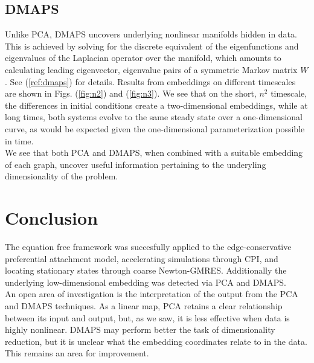 \documentclass[12pt]{article}
\begin{document}
\begin{onehalfspace}
\subsection{DMAPS}

Unlike PCA, DMAPS uncovers underlying nonlinear manifolds hidden in data. This is achieved by solving for the discrete equivalent of the eigenfunctions and eigenvalues of the Laplacian operator over the manifold, which amounts to calculating leading eigenvector, eigenvalue pairs of a symmetric Markov matrix $W$. See (\ref{ref:dmaps}) for details. Results from embeddings on different timescales are shown in Figs. (\ref{fig:n2}) and (\ref{fig:n3}). We see that on the short, $n^2$ timescale, the differences in initial conditions create a two-dimensional embeddings, while at long times, both systems evolve to the same steady state over a one-dimensional curve, as would be expected given the one-dimensional parameterization possible in time. \\

We see that both PCA and DMAPS, when combined with a suitable embedding of each graph, uncover useful information pertaining to the underyling dimensionality of the problem.


\section{Conclusion}

The equation free framework was succesfully applied to the edge-conservative preferential attachment model, accelerating simulations through CPI, and locating stationary states through coarse Newton-GMRES. Additionally the underlying low-dimensional embedding was detected via PCA and DMAPS. \\

An open area of investigation is the interpretation of the output from the PCA and DMAPS techniques. As a linear map, PCA retains a clear relationship between its input and output, but, as we saw, it is less effective when data is highly nonlinear. DMAPS may perform better the task of dimensionality reduction, but it is unclear what the embedding coordinates relate to in the data. This remains an area for improvement.










\end{onehalfspace}



\end{document}
